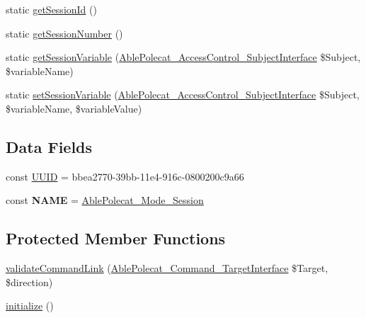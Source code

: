 \begin{DoxyCompactItemize}
\item 
static \hyperlink{class_able_polecat___mode___session_aa8a076017fb010a456c1afbb4a94da2e}{get\+Session\+Id} ()
\item 
static \hyperlink{class_able_polecat___mode___session_aec7157d76bfc0a3a0f577f90fae7bc33}{get\+Session\+Number} ()
\item 
static \hyperlink{class_able_polecat___mode___session_a8b8c4e7cd29f54e85cbde74c21f22250}{get\+Session\+Variable} (\hyperlink{interface_able_polecat___access_control___subject_interface}{Able\+Polecat\+\_\+\+Access\+Control\+\_\+\+Subject\+Interface} \$Subject, \$variable\+Name)
\item 
static \hyperlink{class_able_polecat___mode___session_aa518ae714a59feda52322b4a27283ba8}{set\+Session\+Variable} (\hyperlink{interface_able_polecat___access_control___subject_interface}{Able\+Polecat\+\_\+\+Access\+Control\+\_\+\+Subject\+Interface} \$Subject, \$variable\+Name, \$variable\+Value)
\end{DoxyCompactItemize}
\subsection*{Data Fields}
\begin{DoxyCompactItemize}
\item 
const \hyperlink{class_able_polecat___mode___session_a74b892c8c0b86bf9d04c5819898c51e7}{U\+U\+I\+D} = \textquotesingle{}bbea2770-\/39bb-\/11e4-\/916c-\/0800200c9a66\textquotesingle{}
\item 
\hypertarget{class_able_polecat___mode___session_a244352f035b82b20b0efa506167fd862}{}const {\bfseries N\+A\+M\+E} = \textquotesingle{}\hyperlink{class_able_polecat___mode___session}{Able\+Polecat\+\_\+\+Mode\+\_\+\+Session}\textquotesingle{}\label{class_able_polecat___mode___session_a244352f035b82b20b0efa506167fd862}

\end{DoxyCompactItemize}
\subsection*{Protected Member Functions}
\begin{DoxyCompactItemize}
\item 
\hyperlink{class_able_polecat___mode___session_a37906da60d0165610266b97b07bc5267}{validate\+Command\+Link} (\hyperlink{interface_able_polecat___command___target_interface}{Able\+Polecat\+\_\+\+Command\+\_\+\+Target\+Interface} \$Target, \$direction)
\item 
\hyperlink{class_able_polecat___mode___session_a91098fa7d1917ce4833f284bbef12627}{initialize} ()
\end{DoxyCompactItemize}
